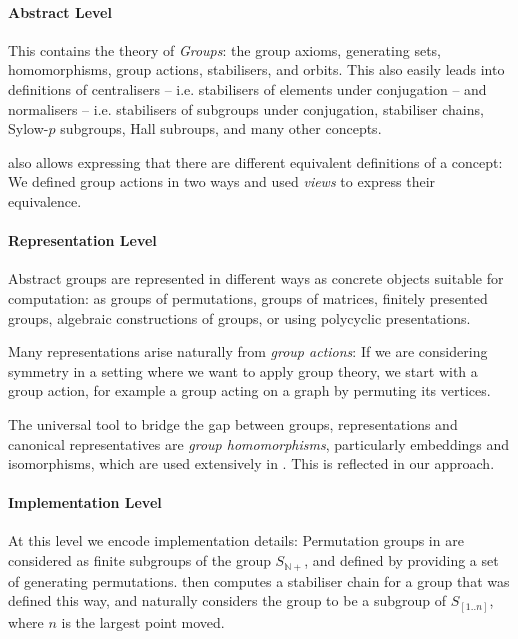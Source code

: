 \paragraph{Abstract Level} This contains the theory of \emph{Groups}: the group
axioms, generating sets, homomorphisms, group actions, stabilisers, and orbits.
This also easily leads into definitions of centralisers -- i.e. stabilisers of
elements under conjugation -- and normalisers -- i.e. stabilisers of subgroups
under conjugation, stabiliser chains, Sylow-$p$ subgroups, Hall subroups, and
many other concepts.

\OMMT also allows expressing that there are different equivalent definitions of
a concept: We defined group actions in two ways and used \emph{views} to express
their equivalence.

\paragraph{Representation Level} 
Abstract groups are represented in different ways as concrete objects
suitable for computation: as groups of permutations, groups of matrices,
finitely presented groups, algebraic constructions of groups, or using
polycyclic presentations.


Many representations arise naturally from \emph{group actions}: If we are
considering symmetry in a setting where we want to apply group theory, we start
with a group action, for example a group acting on a graph by permuting its
vertices.


The universal tool to bridge the gap between groups, representations and
canonical representatives are \emph{group homomorphisms}, particularly
embeddings and isomorphisms, which are used extensively in \GAP. This is
reflected in our approach.

\paragraph{Implementation Level}
At this level we encode implementation details: Permutation groups in \GAP
are considered as finite subgroups of the group $S_{\mathbb{N}+}$, and defined by
providing a set of generating permutations. \GAP then computes a stabiliser chain
for a group that was defined this way, and naturally considers the group to be a
subgroup of $S_{[1..n]}$, where $n$ is the largest point moved.

